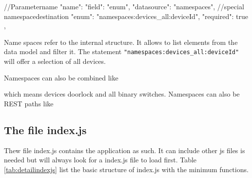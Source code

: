 \begin{listingverbatim}
{
  //Parametername
  "name": {
    "field": "enum",
    "datasource": "namespaces",
    //special namespacedestination
    "enum": "namespaces:devices\_all:deviceId",
    "required": true
  },
}
\end{listingverbatim}



Name spaces refer to the internal \zway structure. It allows to list elements from 
the \zway data model and filter it. The statement 
\texttt{"namespaces:devices\_all:deviceId"} will offer a selection of all devices.

Namespaces can also be combined like


which means devices doorlock and all binary switches.
Namespaces can also be REST paths like



\subsection{The file index.js}

Thew file index.js contains the application as such. It can include other js files is needed 
but \zway will always look for a index.js file to load first. Table \ref{tab:detailindexjs}
list the basic structure of index.js with the minimum functions.


